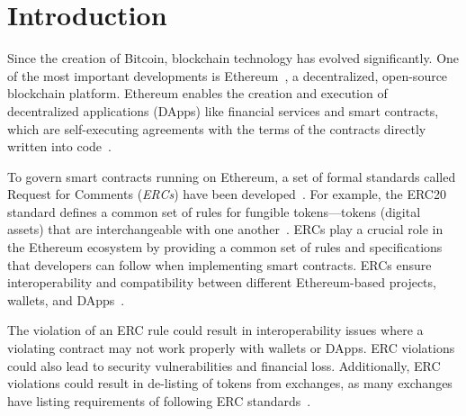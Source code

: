 \section{Introduction}
\label{sec:intro}

Since the creation of Bitcoin, blockchain technology has evolved significantly.
One of the most important developments is Ethereum~\cite{eth-1,eth-2}, a decentralized, open-source blockchain platform. Ethereum enables the creation and execution of decentralized applications (DApps) like financial services and smart contracts, which are self-executing agreements with the terms of the contracts directly written into code~\cite{dapps, sc-anatomy}. 

To govern smart contracts running on Ethereum, a set of formal standards called Request for Comments (\textit{ERCs}) have been developed~\cite{token-standard}. For example, the ERC20 standard defines a common set of rules for fungible tokens---tokens (digital assets) that are interchangeable with one another~\cite{erc20}. 
ERCs play a crucial role in the Ethereum ecosystem by providing a 
common set of rules and specifications that developers can follow when implementing smart contracts. ERCs ensure interoperability 
and compatibility between different Ethereum-based projects, 
wallets, and DApps~\cite{dapps}. 



The violation of an ERC rule could result in interoperability issues where a violating contract may not work properly with wallets or DApps. ERC violations could also lead to security vulnerabilities and financial loss. Additionally, ERC violations could result in de-listing of tokens from exchanges, as many exchanges have listing requirements of following ERC standards~\cite{erc-standard}.
%

